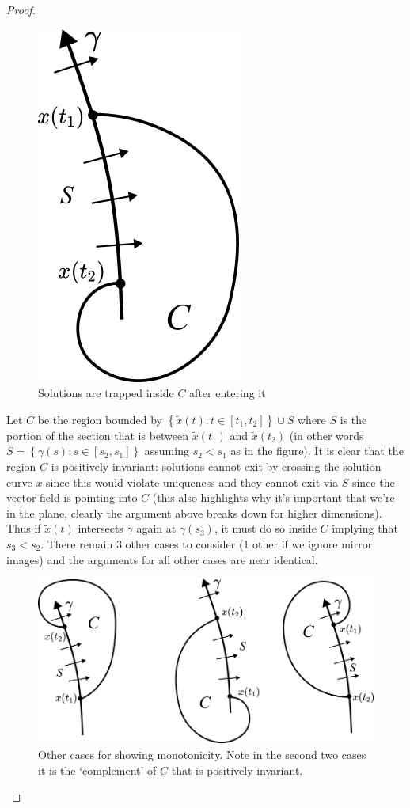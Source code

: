 \begin{proof}
\begin{figure}[h]
    \centering
    \includegraphics[scale=0.8]{Images/section_monotone.png}
    \caption{Solutions are trapped inside $C$ after entering it}
    \label{fig:section-monotone}
\end{figure}

Let $C$ be the region bounded by $\left\{\tilde{x}(t): t \in [t_1, t_2]\right\} \cup S$ where $S$ is the portion of the section that is between $\tilde{x}(t_1)$ and $\tilde{x}(t_2)$ (in other words $S = \left\{\gamma(s) : s \in [s_2, s_1]\right\}$ assuming $s_2 < s_1$ as in the figure). It is clear that the region $C$ is positively invariant: solutions cannot exit by crossing the solution curve $x$ since this would violate uniqueness and they cannot exit via $S$ since the vector field is pointing into $C$ (this also highlights why it's important that we're in the plane, clearly the argument above breaks down for higher dimensions). Thus if $\tilde{x}(t)$ intersects $\gamma$ again at $\gamma(s_3)$, it must do so inside $C$ implying that $s_3 < s_2$. There remain 3 other cases to consider (1 other if we ignore mirror images) and the arguments for all other cases are near identical.
\begin{figure}[h]
    \centering
    \includegraphics[scale=0.7]{Images/section_monotone_other_cases.png}
    \caption{Other cases for showing monotonicity. Note in the second two cases it is the `complement' of $C$ that is positively invariant.}
    \label{fig:section-monotone-other-cases}
\end{figure}


\end{proof}
